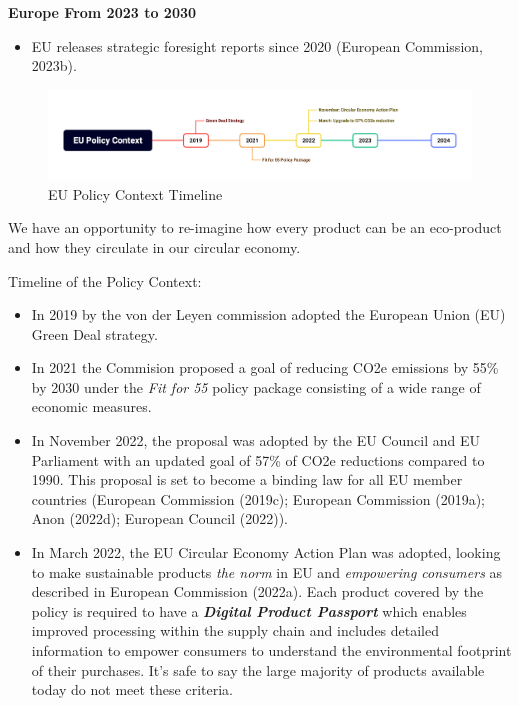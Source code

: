 \documentclass[
  letterpaper,
  DIV=11,
  numbers=noendperiod]{scrartcl}
\providecommand{\tightlist}{%
  \setlength{\itemsep}{0pt}\setlength{\parskip}{0pt}}\usepackage{longtable,booktabs,array}
\begin{document}
\textbf{Europe From 2023 to 2030}

\begin{itemize}
\tightlist
\item
  EU releases strategic foresight reports since 2020 (European
  Commission, 2023b).
\end{itemize}

\begin{figure}[H]

{\centering \includegraphics[width=1\linewidth,height=\textheight,keepaspectratio]{./images/sustainability/eu-policy-context.png}

}

\caption{EU Policy Context Timeline}

\end{figure}%

We have an opportunity to re-imagine how every product can be an
eco-product and how they circulate in our circular economy.

Timeline of the Policy Context:

\begin{itemize}
\item
  In 2019 by the von der Leyen commission adopted the European Union
  (EU) Green Deal strategy.
\item
  In 2021 the Commision proposed a goal of reducing CO2e emissions by
  55\% by 2030 under the \emph{Fit for 55} policy package consisting of
  a wide range of economic measures.
\item
  In November 2022, the proposal was adopted by the EU Council and EU
  Parliament with an updated goal of 57\% of CO2e reductions compared to
  1990. This proposal is set to become a binding law for all EU member
  countries (European Commission (2019c); European Commission (2019a);
  Anon (2022d); European Council (2022)).
\item
  In March 2022, the EU Circular Economy Action Plan was adopted,
  looking to make sustainable products \emph{the norm} in EU and
  \emph{empowering consumers} as described in European Commission
  (2022a). Each product covered by the policy is required to have a
  \textbf{\emph{Digital Product Passport}} which enables improved
  processing within the supply chain and includes detailed information
  to empower consumers to understand the environmental footprint of
  their purchases. It's safe to say the large majority of products
  available today do not meet these criteria.
\end{itemize}
\end{document}
